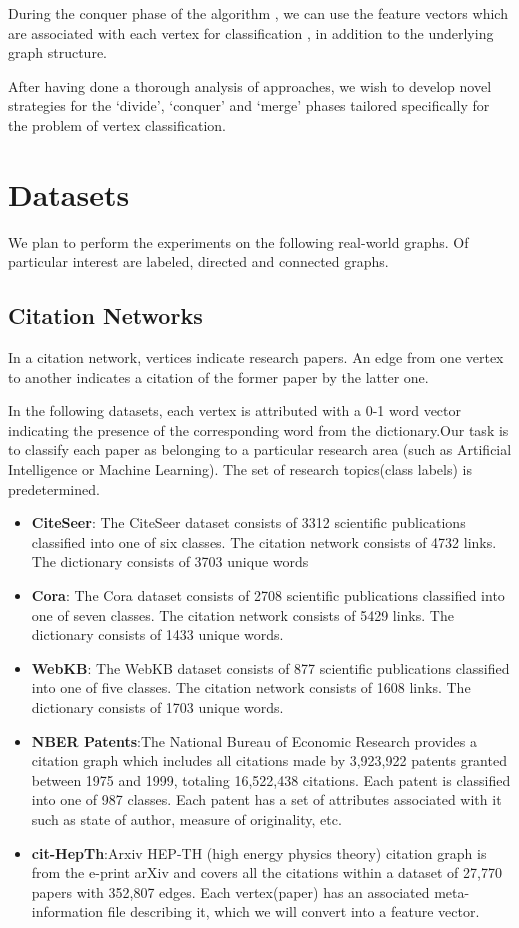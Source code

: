 \documentclass{article}
\begin{document}
During the conquer phase of the algorithm , we can use the feature vectors which are associated with each vertex for classification , in addition to the underlying graph structure.

After having done a thorough analysis of approaches, we wish to develop novel strategies for the ‘divide’, ‘conquer’ and ‘merge’ phases tailored specifically for the problem of vertex classification.  

\section*{Datasets}
We plan to perform the experiments on the following real-world graphs. Of particular interest are labeled, directed and connected graphs.

\subsection*{Citation Networks}
 In a citation network, vertices indicate research papers. An edge from one vertex to another indicates a citation of the former paper by the latter one.

In the following datasets, each vertex is attributed with a 0-1 word vector indicating the presence of the corresponding word from the dictionary.Our task is to classify each paper as belonging to a particular research area (such as Artificial Intelligence or Machine Learning). The set of research topics(class labels) is predetermined.
\begin{itemize}
\item \textbf{CiteSeer}: The CiteSeer dataset consists of 3312 scientific publications classified into one of six classes. The citation network consists of 4732 links. The dictionary consists of 3703 unique words
\item \textbf {Cora}: The Cora dataset consists of 2708 scientific publications classified into one of seven classes. The citation network consists of 5429 links. The dictionary consists of 1433 unique words. 
\item \textbf{WebKB}: The WebKB dataset consists of 877 scientific publications classified into one of five classes. The citation network consists of 1608 links. The dictionary consists of 1703 unique words.
\item \textbf{NBER Patents}:The National Bureau of Economic Research provides a citation graph which includes all citations made by 3,923,922 patents granted between 1975 and 1999, totaling 16,522,438 citations. Each patent is classified into one of 987 classes. Each patent has a set of attributes associated with it such as state of author, measure of originality, etc.
\item \textbf{cit-HepTh}:Arxiv HEP-TH (high energy physics theory) citation graph is from the e-print arXiv and covers all the citations within a dataset of 27,770 papers with 352,807 edges. Each vertex(paper) has an associated meta-information file describing it, which we will convert into a feature vector.
\end{itemize}   
\end{document}
